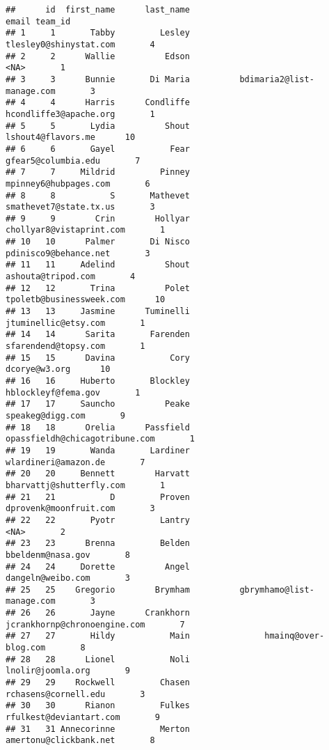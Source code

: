 \documentclass[]{article}
\begin{document}
\begin{verbatim}
##      id  first_name      last_name                              email team_id
## 1     1       Tabby         Lesley             tlesley0@shinystat.com       4
## 2     2      Wallie          Edson                               <NA>       1
## 3     3      Bunnie       Di Maria          bdimaria2@list-manage.com       3
## 4     4      Harris      Condliffe             hcondliffe3@apache.org       1
## 5     5       Lydia          Shout                 lshout4@flavors.me      10
## 6     6       Gayel           Fear                gfear5@columbia.edu       7
## 7     7     Mildrid         Pinney              mpinney6@hubpages.com       6
## 8     8           S       Mathevet             smathevet7@state.tx.us       3
## 9     9        Crin        Hollyar           chollyar8@vistaprint.com       1
## 10   10      Palmer       Di Nisco              pdinisco9@behance.net       3
## 11   11     Adelind          Shout                 ashouta@tripod.com       4
## 12   12       Trina          Polet           tpoletb@businessweek.com      10
## 13   13     Jasmine      Tuminelli               jtuminellic@etsy.com       1
## 14   14      Sarita       Farenden               sfarendend@topsy.com       1
## 15   15      Davina           Cory                      dcorye@w3.org      10
## 16   16     Huberto       Blockley                hblockleyf@fema.gov       1
## 17   17     Sauncho          Peake                   speakeg@digg.com       9
## 18   18      Orelia      Passfield     opassfieldh@chicagotribune.com       1
## 19   19       Wanda       Lardiner               wlardineri@amazon.de       7
## 20   20     Bennett        Harvatt           bharvattj@shutterfly.com       1
## 21   21           D         Proven             dprovenk@moonfruit.com       3
## 22   22       Pyotr         Lantry                               <NA>       2
## 23   23      Brenna         Belden                  bbeldenm@nasa.gov       8
## 24   24     Dorette          Angel                  dangeln@weibo.com       3
## 25   25    Gregorio        Brymham          gbrymhamo@list-manage.com       3
## 26   26       Jayne      Crankhorn       jcrankhornp@chronoengine.com       7
## 27   27       Hildy           Main               hmainq@over-blog.com       8
## 28   28      Lionel           Noli                  lnolir@joomla.org       9
## 29   29    Rockwell         Chasen               rchasens@cornell.edu       3
## 30   30      Rianon         Fulkes            rfulkest@deviantart.com       9
## 31   31 Annecorinne         Merton             amertonu@clickbank.net       8

\end{verbatim}
\end{document}
